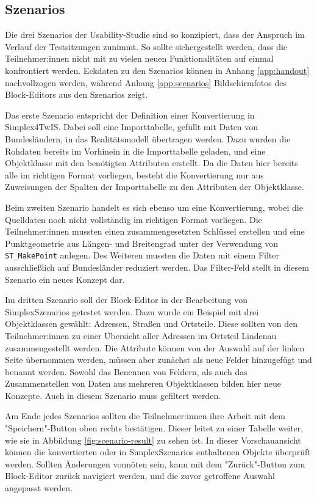 \subsection{Szenarios}
\label{sec:study-szenarios}
Die drei Szenarios der Usability-Studie sind so konzipiert, dass der Anspruch im Verlauf der Testsitzungen zunimmt. So sollte sichergestellt werden, dass die Teilnehmer:innen nicht mit zu vielen neuen Funktionalitäten auf einmal konfrontiert werden. Eckdaten zu den Szenarios können in Anhang \ref{app:handout} nachvollzogen werden, während Anhang \ref{app:scenarios} Bildschirmfotos des Block-Editors aus den Szenarios zeigt.

Das erste Szenario entspricht der Definition einer Konvertierung in Simplex4TwIS. Dabei soll eine Importtabelle, gefüllt mit Daten von Bundesländern, in das Realitätsmodell übertragen werden. Dazu wurden die Rohdaten bereits im Vorhinein in die Importtabelle geladen, und eine Objektklasse mit den benötigten Attributen erstellt. Da die Daten hier bereits alle im richtigen Format vorliegen, besteht die Konvertierung nur aus Zuweisungen der Spalten der Importtabelle zu den Attributen der Objektklasse.

Beim zweiten Szenario handelt es sich ebenso um eine Konvertierung, wobei die Quelldaten noch nicht vollständig im richtigen Format vorliegen. Die Teilnehmer:innen mussten einen zusammengesetzten Schlüssel erstellen und eine Punktgeometrie aus Längen- und Breitengrad unter der Verwendung von \texttt{ST\_MakePoint} anlegen. Des Weiteren mussten die Daten mit einem Filter ausschließlich auf Bundesländer reduziert werden. Das Filter-Feld stellt in diesem Szenario ein neues Konzept dar.

Im dritten Szenario soll der Block-Editor in der Bearbeitung von SimplexSzenarios getestet werden. Dazu wurde ein Beispiel mit drei Objektklassen gewählt: Adressen, Straßen und Ortsteile. Diese sollten von den Teilnehmer:innen zu einer Übersicht aller Adressen im Ortsteil Lindenau zusammengestellt werden. Die Attribute können von der Auswahl auf der linken Seite übernommen werden, müssen aber zunächst als neue Felder hinzugefügt und benannt werden. Sowohl das Benennen von Feldern, als auch das Zusammenstellen von Daten aus mehreren Objektklassen bilden hier neue Konzepte. Auch in diesem Szenario muss gefiltert werden.

Am Ende jedes Szenarios sollten die Teilnehmer:innen ihre Arbeit mit dem "Speichern"-Button oben rechts bestätigen. Dieser leitet zu einer Tabelle weiter, wie sie in Abbildung \ref{fig:scenario-result} zu sehen ist. In dieser Vorschauansicht können die konvertierten oder in SimplexSzenarios enthaltenen Objekte überprüft werden. Sollten Änderungen vonnöten sein, kann mit dem "Zurück"-Button zum Block-Editor zurück navigiert werden, und die zuvor getroffene Auswahl angepasst werden.

